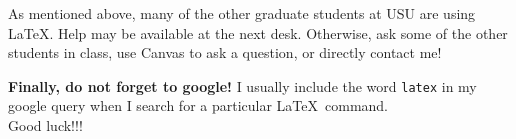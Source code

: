 \documentclass[12pt]{article}
\begin{document}
As mentioned above, many of the other graduate students at USU are using \LaTeX.
Help may be available at the next desk. Otherwise, ask some of the other
students in class, use Canvas to ask a question, or directly contact  me!

{\bf Finally, do not forget to google!} I usually include the word {\tt latex}
in my google query when I search for a particular \LaTeX\ command. \\[2cm]

\noindent
{\Huge Good luck!!!}
\end{document}
